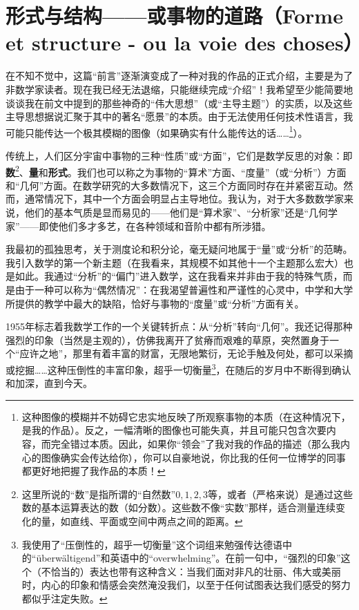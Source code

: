 \section*{形式与结构——或事物的道路（Forme et structure - ou la voie des choses）}

在不知不觉中，这篇“前言”逐渐演变成了一种对我的作品的正式介绍，主要是为了非数学家读者。现在我已经无法退缩，只能继续完成“介绍”！我希望至少能简要地谈谈我在前文中提到的那些神奇的“伟大思想”（或“主导主题”）的实质，以及这些主导思想据说汇聚于其中的著名“愿景”的本质。由于无法使用任何技术性语言，我可能只能传达一个极其模糊的图像（如果确实有什么能传达的话……\footnote{这种图像的模糊并不妨碍它忠实地反映了所观察事物的本质（在这种情况下，是我的作品）。反之，一幅清晰的图像也可能失真，并且可能只包含次要内容，而完全错过本质。因此，如果你“领会”了我对我的作品的描述（那么我内心的图像确实会传达给你），你可以自豪地说，你比我的任何一位博学的同事都更好地把握了我作品的本质！}）。

传统上，人们区分宇宙中事物的三种“性质”或“方面”，它们是数学反思的对象：即\textbf{数}\footnote{这里所说的“数”是指所谓的“自然数”$0,1,2,3$等，或者（严格来说）是通过这些数的基本运算表达的数（如分数）。这些数不像“实数”那样，适合测量连续变化的量，如直线、平面或空间中两点之间的距离。}、\textbf{量}和\textbf{形式}。我们也可以称之为事物的“算术”方面、“度量”（或“分析”）方面和“几何”方面。在数学研究的大多数情况下，这三个方面同时存在并紧密互动。然而，通常情况下，其中一个方面会明显占主导地位。我认为，对于大多数数学家来说，他们的基本气质是显而易见的——他们是“算术家”、“分析家”还是“几何学家”——即使他们多才多艺，在各种领域和音阶中都有所涉猎。

我最初的孤独思考，关于测度论和积分论，毫无疑问地属于“量”或“分析”的范畴。我引入数学的第一个新主题（在我看来，其规模不如其他十一个主题那么宏大）也是如此。我通过“分析”的“偏门”进入数学，这在我看来并非由于我的特殊气质，而是由于一种可以称为“偶然情况”：在我渴望普遍性和严谨性的心灵中，中学和大学所提供的教学中最大的缺陷，恰好与事物的“度量”或“分析”方面有关。

1955年标志着我数学工作的一个关键转折点：从“分析”转向“几何”。我还记得那种强烈的印象（当然是主观的），仿佛我离开了贫瘠而艰难的草原，突然置身于一个“应许之地”，那里有着丰富的财富，无限地繁衍，无论手触及何处，都可以采摘或挖掘……这种压倒性的丰富印象，超乎一切衡量\footnote{我使用了“压倒性的，超乎一切衡量”这个词组来勉强传达德语中的“überwältigend”和英语中的“overwhelming”。在前一句中，“强烈的印象”这个（不恰当的）表达也带有这种含义：当我们面对非凡的壮丽、伟大或美丽时，内心的印象和情感会突然淹没我们，以至于任何试图表达我们感受的努力都似乎注定失败。}，在随后的岁月中不断得到确认和加深，直到今天。

